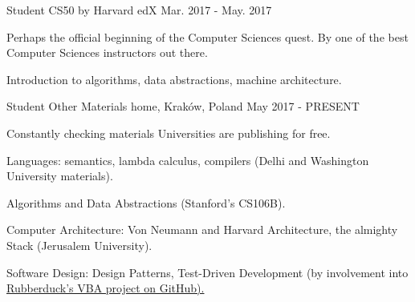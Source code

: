 \begin{cventries}
  \cventry
    {Student}
    {CS50 by Harvard}
    {edX}
	{Mar. 2017 - May. 2017} %
    {
		\begin{cvitems} %
			\item {Perhaps the official beginning of the Computer Sciences quest. By one of the best Computer Sciences instructors out there.}
			\item {Introduction to algorithms, data abstractions, machine architecture.}
		\end{cvitems}
    }

\cventry
	{Student}
	{Other Materials}
	{home, Kraków, Poland}
	{May 2017 - PRESENT}
	{
		\begin{cvitems} %
			\item {Constantly checking materials Universities are publishing for free.}
			\item {Languages: semantics, lambda calculus, compilers (Delhi and Washington University materials).}
			\item {Algorithms and Data Abstractions (Stanford's CS106B).}
			\item {Computer Architecture: Von Neumann and Harvard Architecture, the almighty Stack (Jerusalem University).}
			\item {Software Design: Design Patterns, Test-Driven Development (by involvement into \href{https://github.com/rubberduck-vba/Rubberduck}{Rubberduck's VBA project on GitHub).}}
		\end{cvitems}
	}

\end{cventries}
